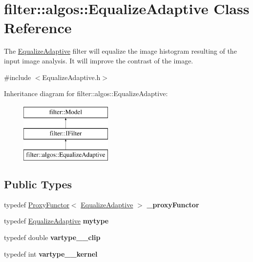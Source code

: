 \hypertarget{classfilter_1_1algos_1_1_equalize_adaptive}{}\section{filter\+:\+:algos\+:\+:Equalize\+Adaptive Class Reference}
\label{classfilter_1_1algos_1_1_equalize_adaptive}


The \hyperlink{classfilter_1_1algos_1_1_equalize_adaptive}{Equalize\+Adaptive} filter will equalize the image histogram resulting of the input image analysis. It will improve the contrast of the image.  




{\ttfamily \#include $<$Equalize\+Adaptive.\+h$>$}

Inheritance diagram for filter\+:\+:algos\+:\+:Equalize\+Adaptive\+:\begin{figure}[H]
\begin{center}
\leavevmode
\includegraphics[height=3.000000cm]{d1/de5/classfilter_1_1algos_1_1_equalize_adaptive}
\end{center}
\end{figure}
\subsection*{Public Types}
\begin{DoxyCompactItemize}
\item 
\mbox{\label{classfilter_1_1algos_1_1_equalize_adaptive_a481933032e94867c528a90f7f11249e8}} 
typedef \hyperlink{class_proxy_functor}{Proxy\+Functor}$<$ \hyperlink{classfilter_1_1algos_1_1_equalize_adaptive}{Equalize\+Adaptive} $>$ {\bfseries \+\_\+proxy\+Functor}
\item 
\mbox{\label{classfilter_1_1algos_1_1_equalize_adaptive_a4bb3ef65b29a2541a1966d0c7f6fcafb}} 
typedef \hyperlink{classfilter_1_1algos_1_1_equalize_adaptive}{Equalize\+Adaptive} {\bfseries mytype}
\item 
\mbox{\label{classfilter_1_1algos_1_1_equalize_adaptive_aec362799ac1e93a7e4242ef95e4f38a2}} 
typedef double {\bfseries vartype\+\_\+\+\_\+clip}
\item 
\mbox{\label{classfilter_1_1algos_1_1_equalize_adaptive_af6d0553efaddee0a597bbb7409a52b1a}} 
typedef int {\bfseries vartype\+\_\+\+\_\+kernel}
\end{DoxyCompactItemize}
